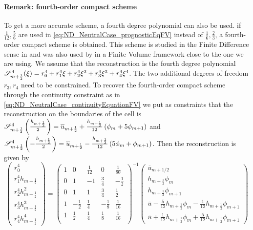 \paragraph{Remark: fourth-order compact scheme}
To get a more accurate scheme,
a fourth degree polynomial can also be used.
if $\frac{1}{12}, \frac{5}{6}$ are used in
\eqref{eq:ND_NeutralCase_prognosticEqFV} instead of
$\frac{1}{6}, \frac{2}{3}$, a fourth-order compact scheme
is obtained. This scheme is studied in the Finite Difference sense
in \citep{adam_highly_1977} and was also used
by \cite{piller_finite-volume_2004} in a Finite Volume framework
close to the one we are using.
We assume that the reconstruction is the fourth degree
polynomial
${\cal S}_{m+\frac{1}{2}}^4(\xi) = r_0^4 + r_1^4 \xi + r_2^4 \xi^2 
+ r_3^4 \xi^3 + r_4^4 \xi^4$.
The two additional degrees of freedom $r_3, r_4$ need to be
constrained. To recover the fourth-order compact scheme through
the continuity constraint as in
\eqref{eq:ND_NeutralCase_continuityEquationFV}
we put as constraints that the
reconstruction on the boundaries of the cell is
${\cal S}^4_{m+\frac{1}{2}}\left(\frac{h_{m+\frac{1}{2}}}{2}\right) =
\overline{u}_{m+\frac{1}{2}} + \frac{h_{m+\frac{1}{2}}}{12}\left(
\phi_m + 5\phi_{m+1}\right) $ and
${\cal S}^4_{m+\frac{1}{2}}\left(-\frac{h_{m+\frac{1}{2}}}{2}\right) =
\overline{u}_{m+\frac{1}{2}} - \frac{h_{m+\frac{1}{2}}}{12}\left(
5\phi_m + \phi_{m+1}\right)$.
Then the reconstruction is given by
\begin{equation}
    \begin{pmatrix}
    r_0^4 \\
    r_1^4 h_{m+\frac{1}{2}} \\
    r_2^4 h_{m+\frac{1}{2}}^2 \\
    r_3^4 h_{m+\frac{1}{2}}^3 \\
    r_4^4 h_{m+\frac{1}{2}}^4
    \end{pmatrix}
     = 
    \begin{pmatrix}
    1 & 0 & \frac{1}{12} & 0 & \frac{1}{80} \\
    0 & 1 & -1 & \frac{3}{4} & -\frac{1}{2} \\
    0 & 1 & 1 & \frac{3}{4} & \frac{1}{2} \\
    1 & -\frac{1}{2} & \frac{1}{4} & -\frac{1}{8}
    & \frac{1}{16} \\
    1 & \frac{1}{2} & \frac{1}{4} & \frac{1}{8}
    & \frac{1}{16} \\
    \end{pmatrix}^{-1}
    \begin{pmatrix}
    \overline{u}_{m+1/2} \\
    h_{m+\frac{1}{2}} \phi_m \\
	    h_{m+\frac{1}{2}} \phi_{m+1} \\
	    \overline{u} - \frac{5}{12} h_{m+\frac{1}{2}} \phi_m
	    - \frac{1}{12} h_{m+\frac{1}{2}} \phi_{m+1} \\
	    \overline{u} + \frac{1}{12} h_{m+\frac{1}{2}} \phi_m
	    + \frac{5}{12} h_{m+\frac{1}{2}} \phi_{m+1}
    \end{pmatrix}
\end{equation}
